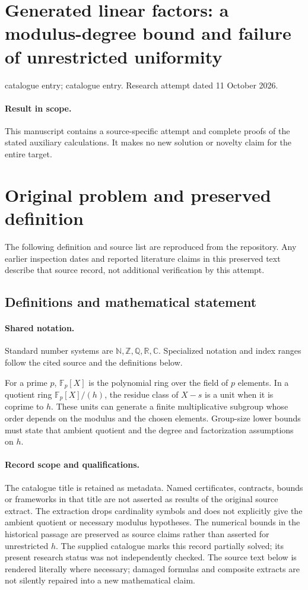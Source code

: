 \documentclass[11pt]{article}
\begin{document}
\section*{Generated linear factors: a modulus-degree bound and failure of unrestricted uniformity}
\noindent catalogue entry; catalogue entry. Research attempt dated 11 October 2026.
\paragraph{Result in scope.}This manuscript contains a source-specific attempt and complete proofs of the stated auxiliary calculations. It makes no new solution or novelty claim for the entire target.
\section{Original problem and preserved definition}
The following definition and source list are reproduced from the repository. Any earlier inspection dates and reported literature claims in this preserved text describe that source record, not additional verification by this attempt.
\subsection{Definitions and mathematical statement}

\paragraph{Shared notation.}Standard number systems are $\mathbb N,\mathbb Z,\mathbb Q,\mathbb R,\mathbb C$. Specialized notation and index ranges follow the cited source and the definitions below.


For a prime $p$, $\mathbb F_p[X]$ is the polynomial ring over the field of $p$ elements. In a quotient ring $\mathbb F_p[X]/(h)$, the residue class of $X-s$ is a unit when it is coprime to $h$. These units can generate a finite multiplicative subgroup whose order depends on the modulus and the chosen elements. Group-size lower bounds must state that ambient quotient and the degree and factorization assumptions on $h$.
\paragraph{Record scope and qualifications.}
The catalogue title is retained as metadata. Named certificates, contracts, bounds or frameworks in that title are not asserted as results of the original source extract.
The extraction drops cardinality symbols and does not explicitly give the ambient quotient or necessary modulus hypotheses. The numerical bounds in the historical passage are preserved as source claims rather than asserted for unrestricted $h$. The supplied catalogue marks this record partially solved; its present research status was not independently checked.
The source text below is rendered literally where necessary; damaged formulas and composite extracts are not silently repaired into a new mathematical claim.
\end{document}

